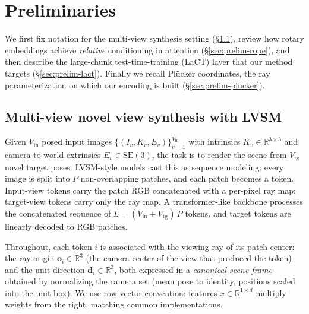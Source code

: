 
\newcommand{\ours}{PRA\xspace}   %
\newcommand{\R}{\mathbb{R}}
\newcommand{\ip}[2]{\left\langle #1, #2 \right\rangle}
\newcommand{\silu}{\mathrm{silu}}
\newcommand{\NS}{\mathrm{NS}}

\section{Preliminaries}
\label{sec:prelim}

We first fix notation for the multi-view synthesis setting
(\S\ref{sec:prelim-nvs}), review how rotary embeddings achieve
\emph{relative} conditioning in attention (\S\ref{sec:prelim-rope}), and then
describe the large-chunk test-time-training (LaCT) layer that our method
targets (\S\ref{sec:prelim-lact}). Finally we recall Plücker coordinates,
the ray parameterization on which our encoding is built
(\S\ref{sec:prelim-plucker}).

\subsection{Multi-view novel view synthesis with LVSM}
\label{sec:prelim-nvs}

Given $V_{\mathrm{in}}$ posed input images
$\{(I_v, K_v, E_v)\}_{v=1}^{V_{\mathrm{in}}}$ with intrinsics
$K_v \in \R^{3\times3}$ and camera-to-world extrinsics
$E_v \in \mathrm{SE}(3)$, the task is to render the scene from
$V_{\mathrm{tg}}$ novel target poses. LVSM-style models
cast this as sequence modeling: every image is split into
$P$ non-overlapping patches, and each patch becomes a token. Input-view
tokens carry the patch RGB concatenated with a per-pixel ray map; target-view
tokens carry only the ray map. A transformer-like backbone processes the
concatenated sequence of $L = (V_{\mathrm{in}} + V_{\mathrm{tg}})\,P$ tokens,
and target tokens are linearly decoded to RGB patches.

Throughout, each token $i$ is associated with the viewing ray of its patch
center: the ray origin $\mathbf{o}_i \in \R^3$ (the camera center of the view
that produced the token) and the unit direction $\mathbf{d}_i \in \R^3$,
both expressed in a \emph{canonical scene frame} obtained by normalizing the
camera set (mean pose to identity, positions scaled into the unit box).
We use row-vector convention: features $x \in \R^{1 \times d}$ multiply
weights from the right, matching common implementations.

